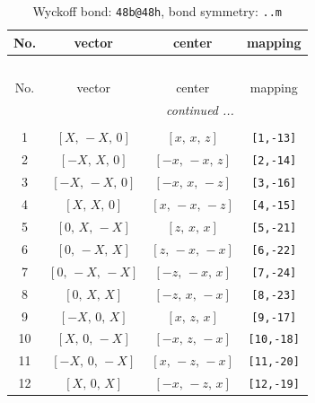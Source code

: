 \documentclass[fleqn,8pt]{jsarticle}
\begin{document}
\begin{longtable}{cccc}
\caption{Wyckoff bond: {\tt 48b@48h}, bond symmetry: {\tt ..m}}
 \\
 \hline \hline
No. & vector & center & mapping \\ \hline \endfirsthead

\multicolumn{3}{l}{\tablename\ \thetable{}} \\
 \hline \hline
No. & vector & center & mapping \\ \hline \endhead

 \hline \hline
\multicolumn{3}{r}{\footnotesize\it continued ...} \\ \endfoot

 \hline \hline
\multicolumn{3}{r}{} \\ \endlastfoot

1 & $\left[ X,\, - X,\, 0 \right]$ & $\left[ x,\, x,\, z \right]$ & {\tt [1,-13]} \\ \hline
2 & $\left[ - X,\, X,\, 0 \right]$ & $\left[ - x,\, - x,\, z \right]$ & {\tt [2,-14]} \\ \hline
3 & $\left[ - X,\, - X,\, 0 \right]$ & $\left[ - x,\, x,\, - z \right]$ & {\tt [3,-16]} \\ \hline
4 & $\left[ X,\, X,\, 0 \right]$ & $\left[ x,\, - x,\, - z \right]$ & {\tt [4,-15]} \\ \hline
5 & $\left[ 0,\, X,\, - X \right]$ & $\left[ z,\, x,\, x \right]$ & {\tt [5,-21]} \\ \hline
6 & $\left[ 0,\, - X,\, X \right]$ & $\left[ z,\, - x,\, - x \right]$ & {\tt [6,-22]} \\ \hline
7 & $\left[ 0,\, - X,\, - X \right]$ & $\left[ - z,\, - x,\, x \right]$ & {\tt [7,-24]} \\ \hline
8 & $\left[ 0,\, X,\, X \right]$ & $\left[ - z,\, x,\, - x \right]$ & {\tt [8,-23]} \\ \hline
9 & $\left[ - X,\, 0,\, X \right]$ & $\left[ x,\, z,\, x \right]$ & {\tt [9,-17]} \\ \hline
10 & $\left[ X,\, 0,\, - X \right]$ & $\left[ - x,\, z,\, - x \right]$ & {\tt [10,-18]} \\ \hline
11 & $\left[ - X,\, 0,\, - X \right]$ & $\left[ x,\, - z,\, - x \right]$ & {\tt [11,-20]} \\ \hline
12 & $\left[ X,\, 0,\, X \right]$ & $\left[ - x,\, - z,\, x \right]$ & {\tt [12,-19]} \\
\end{longtable}
\renewcommand{\arraystretch}{1.2}
\end{document}
